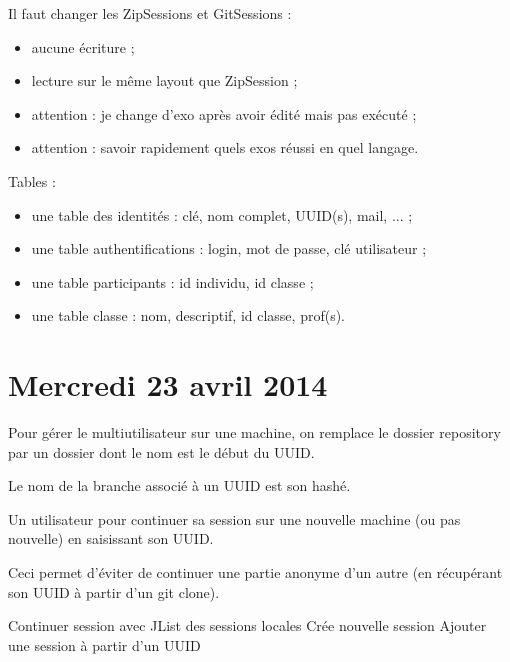 \documentclass[12pt,a4paper]{article}
\begin{document}
Il faut changer les ZipSessions et GitSessions :
\begin{itemize}
\item aucune écriture ;
\item lecture sur le même layout que ZipSession ;
\item attention : je change d'exo après avoir édité mais pas exécuté ;
\item attention : savoir rapidement quels exos réussi en quel langage.
\end{itemize}

Tables :
\begin{itemize}
\item une table des identités : clé, nom complet, UUID(s), mail, ... ;
\item une table authentifications : login, mot de passe, clé utilisateur ;
\item une table participants : id individu, id classe ;
\item une table classe : nom, descriptif, id classe, prof(s).
\end{itemize}



%
%

\section{Mercredi 23 avril 2014}

Pour gérer le multiutilisateur sur une machine, on remplace le dossier repository par un dossier dont le nom est le début du UUID.

Le nom de la branche associé à un UUID est son hashé.

Un utilisateur pour continuer sa session sur une nouvelle machine (ou pas nouvelle) en saisissant son UUID.

Ceci permet d'éviter de continuer une partie anonyme d'un autre (en récupérant son UUID à partir d'un git clone).

Continuer session avec JList des sessions locales
Crée nouvelle session
Ajouter une session à partir d'un UUID
\end{document}
